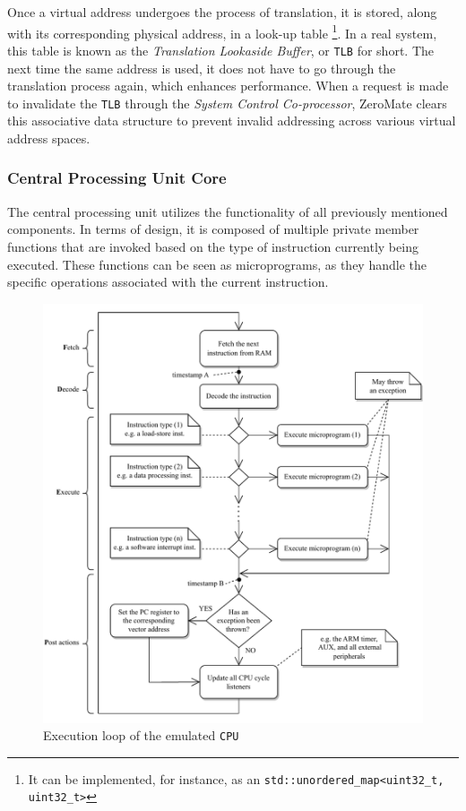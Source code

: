 \documentclass[english, ing, kiv, he, iso690numb, pdf]{fasthesis}
\begin{document}
	Once a virtual address undergoes the process of translation, it is stored, along with its corresponding physical address, in a look-up table \footnote{It can be implemented, for instance, as an \texttt{std::unordered\_map<uint32\_t, uint32\_t>}}. In a real system, this table is known as the \textit{Translation Lookaside Buffer}, or \texttt{TLB} for short. The next time the same address is used, it does not have to go through the translation process again, which enhances performance. When a request is made to invalidate the \texttt{TLB} through the \textit{System Control Co-processor}, ZeroMate clears this associative data structure to prevent invalid addressing across various virtual address spaces.
	
	\newpage
	
	\subsubsection{Central Processing Unit Core} \label{Central Processing Unit Core}
	
	The central processing unit utilizes the functionality of all previously mentioned components. In terms of design, it is composed of multiple private member functions that are invoked based on the type of instruction currently being executed. These functions can be seen as microprograms, as they handle the specific operations associated with the current instruction.
	
	\begin{figure}[ht]
		\centering
		\includegraphics[width=1.0\textwidth]{img/diagrams/cpu_core.pdf}
		\caption{Execution loop of the emulated \texttt{CPU}\protect\footnotemark}
		\label{Execution loop of the emulated CPU}
	\end{figure}
	
\end{document}
